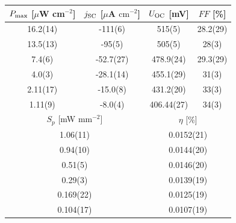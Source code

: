 \begin{table}[h]
\begin{tabular}{@{}cccc@{}}
\toprule
$P_{\text{max}}$ [$\mu$W cm$^{-2}$] & $j_{\text{SC}}$ [$\mu$A $\mathrm{cm}^{-2}$] & $U_{\text{OC}}$ [mV]     & $FF$ [\%]     \\ \midrule
16.2(14)                   & -111(6)                            & 515(5)          & 28.2(29)      \\
13.5(13)                   & -95(5)                             & 505(5)          & 28(3)         \\
7.4(6)                     & -52.7(27)                          & 478.9(24)       & 29.3(29)      \\
4.0(3)                     & -28.1(14)                          & 455.1(29)       & 31(3)         \\
2.11(17)                   & -15.0(8)                           & 431.2(20)       & 33(3)         \\
1.11(9)                    & -8.0(4)                            & 406.44(27)      & 34(3)         \\ \midrule
\multicolumn{2}{c}{$S_p$ [mW mm$^{-2}$]}                        & \multicolumn{2}{c}{$\eta$ [\%]} \\ \midrule
\multicolumn{2}{c}{1.06(11)}                                    & \multicolumn{2}{c}{0.0152(21)}  \\
\multicolumn{2}{c}{0.94(10)}                                    & \multicolumn{2}{c}{0.0144(20)}  \\
\multicolumn{2}{c}{0.51(5)}                                     & \multicolumn{2}{c}{0.0146(20)}  \\
\multicolumn{2}{c}{0.29(3)}                                     & \multicolumn{2}{c}{0.0139(19)}  \\
\multicolumn{2}{c}{0.169(22)}                                   & \multicolumn{2}{c}{0.0125(19)}  \\
\multicolumn{2}{c}{0.104(17)}                                   & \multicolumn{2}{c}{0.0107(19)}  \\ \bottomrule
\end{tabular}
\end{table}


